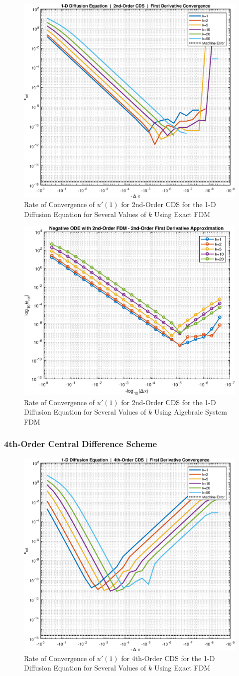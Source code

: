 \documentclass[10pt]{article}		%
\numberwithin{equation}{section}
\begin{document}
\begin{figure}[H]
	\begin{center}
		\includegraphics[width = 0.5\linewidth]{1ddiff2oconv}
		\caption{Rate of Convergence of $u'(1)$ for 2nd-Order CDS for the 1-D Diffusion Equation for Several Values of $k$ Using Exact FDM}	
	\end{center}
\end{figure}

\begin{figure}[H]
	\begin{center}
		\includegraphics[width = 0.5\linewidth]{negative_ode_order_2_fd_order_2}
		\caption{Rate of Convergence of $u'(1)$ for 2nd-Order CDS for the 1-D Diffusion Equation for Several Values of $k$ Using Algebraic System FDM}	
	\end{center}
\end{figure}

\subsubsection{4th-Order Central Difference Scheme}

\begin{figure}[H]
	\begin{center}
		\includegraphics[width = 0.5\linewidth]{1ddiff4oconv}
		\caption{Rate of Convergence of $u'(1)$ for 4th-Order CDS for the 1-D Diffusion Equation for Several Values of $k$ Using Exact FDM}	
	\end{center}
\end{figure}
\end{document}
